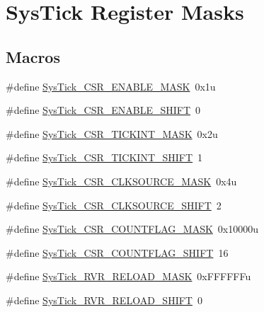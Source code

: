 \hypertarget{group___sys_tick___register___masks}{}\section{Sys\+Tick Register Masks}
\label{group___sys_tick___register___masks}
\subsection*{Macros}
\begin{DoxyCompactItemize}
\item 
\#define \hyperlink{group___sys_tick___register___masks_gac780b47ad7830f8b054650cf9ae10600}{Sys\+Tick\+\_\+\+C\+S\+R\+\_\+\+E\+N\+A\+B\+L\+E\+\_\+\+M\+A\+SK}~0x1u
\item 
\#define \hyperlink{group___sys_tick___register___masks_ga0f710afc23630b3797a50a76beec3418}{Sys\+Tick\+\_\+\+C\+S\+R\+\_\+\+E\+N\+A\+B\+L\+E\+\_\+\+S\+H\+I\+FT}~0
\item 
\#define \hyperlink{group___sys_tick___register___masks_ga8b51f1d83c7a482e111b09e4c5964a2b}{Sys\+Tick\+\_\+\+C\+S\+R\+\_\+\+T\+I\+C\+K\+I\+N\+T\+\_\+\+M\+A\+SK}~0x2u
\item 
\#define \hyperlink{group___sys_tick___register___masks_ga7fc911092251c68f56bc4d2e68ffa0b2}{Sys\+Tick\+\_\+\+C\+S\+R\+\_\+\+T\+I\+C\+K\+I\+N\+T\+\_\+\+S\+H\+I\+FT}~1
\item 
\#define \hyperlink{group___sys_tick___register___masks_ga7e5a1e63ec805119d87e8584a2404831}{Sys\+Tick\+\_\+\+C\+S\+R\+\_\+\+C\+L\+K\+S\+O\+U\+R\+C\+E\+\_\+\+M\+A\+SK}~0x4u
\item 
\#define \hyperlink{group___sys_tick___register___masks_ga99922ae5d9a4c34aa9e2c1673c65d8a4}{Sys\+Tick\+\_\+\+C\+S\+R\+\_\+\+C\+L\+K\+S\+O\+U\+R\+C\+E\+\_\+\+S\+H\+I\+FT}~2
\item 
\#define \hyperlink{group___sys_tick___register___masks_ga5ae827629fd47e5a050f706576f7b425}{Sys\+Tick\+\_\+\+C\+S\+R\+\_\+\+C\+O\+U\+N\+T\+F\+L\+A\+G\+\_\+\+M\+A\+SK}~0x10000u
\item 
\#define \hyperlink{group___sys_tick___register___masks_ga9764e4e8c4ee1b8383ec52f061bd1c87}{Sys\+Tick\+\_\+\+C\+S\+R\+\_\+\+C\+O\+U\+N\+T\+F\+L\+A\+G\+\_\+\+S\+H\+I\+FT}~16
\item 
\#define \hyperlink{group___sys_tick___register___masks_gaec96452b3f6bd6a6ca6496cbbad9a9aa}{Sys\+Tick\+\_\+\+R\+V\+R\+\_\+\+R\+E\+L\+O\+A\+D\+\_\+\+M\+A\+SK}~0x\+F\+F\+F\+F\+F\+Fu
\item 
\#define \hyperlink{group___sys_tick___register___masks_gaada5987ab8604965af6e1437c97ee963}{Sys\+Tick\+\_\+\+R\+V\+R\+\_\+\+R\+E\+L\+O\+A\+D\+\_\+\+S\+H\+I\+FT}~0

\end{DoxyCompactItemize}
